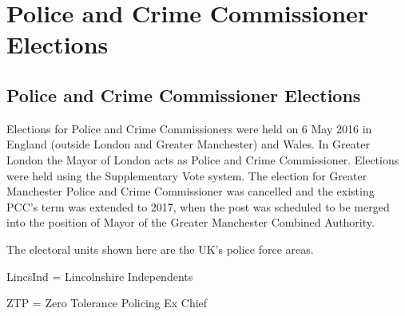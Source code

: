 \part{Police and Crime Commissioner Elections}

\chapter{Police and Crime Commissioner Elections}

Elections for Police and Crime Commissioners were held on 6 May 2016 in England (outside London and Greater Manchester) and Wales.  In Greater London the Mayor of London acts as Police and Crime Commissioner.  Elections were held using the Supplementary Vote system.  The election for Greater Manchester Police and Crime Commissioner was cancelled and the existing PCC's term was extended to 2017, when the post was scheduled to be merged into the position of Mayor of the Greater Manchester Combined Authority.

The electoral units shown here are the UK's police force areas.

%
%
%
LincsInd = Lincolnshire Independents

ZTP = Zero Tolerance Policing Ex Chief

